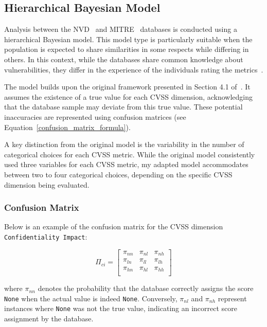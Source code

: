 \documentclass[12pt]{article}
\begin{document}
\subsection{Hierarchical Bayesian Model} \label{bayesian_modeling}

Analysis between the NVD~\cite{NVD} and MITRE~\cite{MITRE} databases is conducted using a
hierarchical Bayesian model. This model type is particularly suitable when the population is
expected to share similarities in some respects while differing in others. In this context, while
the databases share common knowledge about vulnerabilities, they differ in the experience of the
individuals rating the metrics~\cite{bayes}.

The model builds upon the original framework presented in Section 4.1 of~\cite{bayes}. It assumes
the existence of a true value for each CVSS dimension, acknowledging that the database sample may
deviate from this true value. These potential inaccuracies are represented using confusion matrices
(see Equation~\ref{confusion_matrix_formula}).

A key distinction from the original model is the variability in the number of categorical choices
for each CVSS metric. While the original model consistently used three variables for each CVSS
metric, my adapted model accommodates between two to four categorical choices, depending on the
specific CVSS dimension being evaluated.

\subsubsection{Confusion Matrix}

Below is an example of the confusion matrix for the CVSS dimension \texttt{Confidentiality Impact}:

\begin{equation}\label{confusion_matrix_formula}
	\Pi_{ci} = \begin{bmatrix}
		\pi_{nn} & \pi_{nl} & \pi_{nh} \\
		\pi_{ln} & \pi_{ll} & \pi_{lh} \\
		\pi_{hn} & \pi_{hl} & \pi_{hh} \\
	\end{bmatrix}
\end{equation}

where $\pi_{nn}$ denotes the probability that the database correctly assigns the score \texttt{None}
when the actual value is indeed \texttt{None}. Conversely, $\pi_{nl}$ and $\pi_{nh}$ represent
instances where \texttt{None} was not the true value, indicating an incorrect score assignment by
the database.
\end{document}
